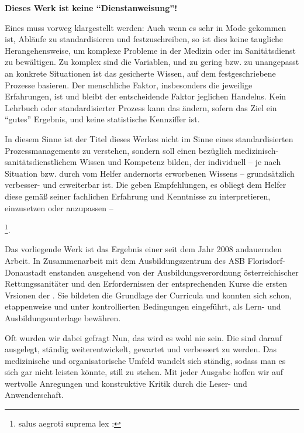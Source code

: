 \documentclass[
ngerman,
paper=a4,
asymmetric,
fontsize=10pt,
draft=false,
numbers=noenddot,
bibtotocnumbered,
footnotes=multiple,
]{scrreprt}
\newcommand{\jALTende}{\newline{\color{red}\rule{\linewidth}{2pt}\newline}}
\newcommand{\jNEU}{\vspace{6pt}\noindent{\color{green}\sffamily\textbf{ADDED}\hrulefill\newline}}
\begin{document}
\begin{enumerate}
\textbf{Dieses Werk ist keine \enquote{Dienstanweisung}!}~~

Eines muss vorweg klargestellt werden: Auch wenn es sehr in
Mode gekommen ist, Abläufe zu standardisieren und
festzuschreiben, so ist dies keine taugliche
Herangehensweise, um komplexe Probleme in der Medizin oder
im Sanitätsdienst zu bewältigen. Zu komplex sind die
Variablen, und zu gering bzw. zu unangepasst an konkrete
Situationen ist das gesicherte Wissen, auf dem
festgeschriebene Prozesse basieren. Der menschliche Faktor,
insbesonders die jeweilige Erfahrungen, ist und bleibt der
entscheidende Faktor jeglichen Handelns. Kein Lehrbuch oder
standardisierter Prozess kann das ändern, sofern das Ziel
ein \enquote{gutes} Ergebnis, und keine statistische Kennziffer
ist.

In diesem Sinne ist der Titel dieses Werkes nicht im Sinne eines
standardisierten Prozessmanagements zu verstehen, sondern soll einen
 bezüglich medizinisch-sanitätsdienstlichem Wissen und
Kompetenz bilden, der individuell -- je nach Situation bzw. durch vom Helfer
andernorts erworbenen Wissens -- grundsätzlich verbesser- und erweiterbar ist. Die {\AASS}
geben Empfehlungen, es obliegt dem Helfer diese gemäß seiner 
fachlichen Erfahrung und Kenntnisse zu interpretieren, einzusetzen oder
anzupassen -- 

\footnote{salus aegroti suprema lex : }.
  \jALTende
  
  \jNEU
  Das vorliegende Werk ist das Ergebnis einer seit dem Jahr 2008 
andauernden Arbeit. 
In Zusammenarbeit mit dem
Ausbildungszentrum des ASB Florisdorf-Donaustadt
enstanden ausgehend von der Ausbildungsverordnung
österreichischer Rettungssanitäter und den Erfordernissen
der entsprechenden Kurse die ersten Vrsionen der {\AASS}.
Sie bildeten die Grundlage der Curricula und
konnten sich schon, etappenweise und unter kontrollierten 
Bedingungen eingeführt, als Lern- und Ausbildungsunterlage bewähren.

Oft wurden wir dabei
gefragt  
Nun, das wird es wohl nie sein. Die {\AASS} sind darauf ausgelegt,
ständig weiterentwickelt, gewartet und verbessert zu werden. Das medizinische
und organisatorische Umfeld wandelt sich ständig, sodass man es sich gar nicht
leisten könnte, still zu stehen.
Mit jeder Ausgabe hoffen wir
auf wertvolle Anregungen und konstruktive Kritik durch die
Leser- und Anwenderschaft.


\end{enumerate}
\end{document}
